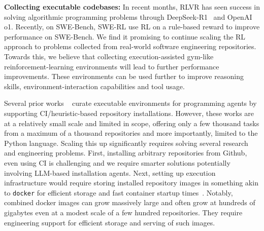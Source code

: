 \textbf{Collecting executable codebases:} In recent months, RLVR has seen success in solving algorithmic programming problems through DeepSeek-R1~\citep{deepseekai2025deepseekr1} and OpenAI o1. Recently, on SWE-Bench, SWE-RL \citep{wei2025swerladvancingllmreasoning} use RL on a rule-based reward to improve performance on SWE-Bench. We find it promising to continue scaling the RL approach to problems collected from real-world software engineering repositories. 
Towards this, we believe that collecting execution-assisted gym-like reinforcement-learning environments will lead to further performance improvements. 
These environments can be used further to improve reasoning skills, environment-interaction capabilities and tool usage.

Several prior works ~\citep{jain2024r2e, pan2024trainingsoftwareengineeringagents,guo2025syncmind, xie2025repost} curate executable environments for programming agents by supporting CI/heuristic-based repository installations.
However, these works are at a relatively small scale and limited in scope, offering only a few thousand tasks from a maximum of a thousand repositories and more importantly, limited to the Python language.
Scaling this up significantly requires solving several research and engineering problems. 
First, installing arbitrary repositories from Github, even using CI is challenging and we require smarter solutions potentially involving LLM-based installation agents.
Next, setting up execution infrastructure would require storing installed repository images in something akin to \verb|docker| for efficient storage and fast container startup times~\citep{team2025kimi}.
Notably, combined docker images can grow massively large and often grow at hundreds of gigabytes even at a modest scale of a few hundred repositories. They require engineering support for efficient storage and serving of such images.




